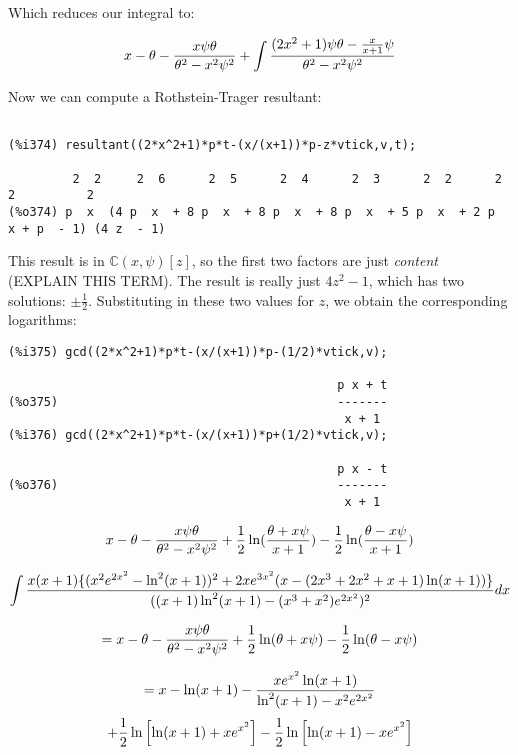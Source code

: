 Which reduces our integral to:


{\LARGE$$x - \theta - {x\psi\theta\over{\theta^2-x^2\psi^2}} +  \int{{(2x^2+1)\psi\theta - {x\over{x+1}}\psi}\over{\theta^2-x^2\psi^2}}$$}



Now we can compute a Rothstein-Trager resultant:

{\small\begin{verbatim}

(%i374) resultant((2*x^2+1)*p*t-(x/(x+1))*p-z*vtick,v,t);

         2  2     2  6      2  5      2  4      2  3      2  2      2      2          2
(%o374) p  x  (4 p  x  + 8 p  x  + 8 p  x  + 8 p  x  + 5 p  x  + 2 p  x + p  - 1) (4 z  - 1)
\end{verbatim}}

This result is in ${\mathbb C}(x,\psi)[z]$, so the first two factors are just
{\it content} (EXPLAIN THIS TERM).  The result is really just $4z^2-1$,
which has two solutions: $\pm\frac{1}{2}$.  Substituting in these two
values for $z$, we obtain the corresponding logarithms:

{\small\begin{verbatim}
(%i375) gcd((2*x^2+1)*p*t-(x/(x+1))*p-(1/2)*vtick,v);

                                              p x + t
(%o375)                                       -------
                                               x + 1
(%i376) gcd((2*x^2+1)*p*t-(x/(x+1))*p+(1/2)*vtick,v);

                                              p x - t
(%o376)                                       -------
                                               x + 1
\end{verbatim}}

{\LARGE$$x - \theta - {x\psi\theta\over{\theta^2-x^2\psi^2}} + {1\over2}\ln({{\theta + x \psi}\over{x+1}}) - {1\over2}\ln({{\theta - x \psi}\over{x+1}})$$}


$$\int{{x(x+1)\{(x^2e^{2x^2}-\ln^2(x+1))^2+2xe^{3x^2}(x-(2x^3+2x^2+x+1)\ln(x+1))\}}\over{((x+1)\ln^2(x+1) - (x^3+x^2)e^{2x^2})^2}} dx$$

{\LARGE$$= x - \theta - {x\psi\theta\over{\theta^2-x^2\psi^2}} + {1\over2}\ln(\theta + x \psi) - {1\over2}\ln(\theta - x \psi)$$}

$$= x - \ln(x+1) - {x e^{x^2}\ln(x+1)\over{\ln^2(x+1)-x^2 e^{2x^2}}}$$
$$+ {1\over2}\ln\left[\ln(x+1) + x e^{x^2}\right] - {1\over2}\ln\left[\ln(x+1) - x e^{x^2}\right]$$

\endexample
